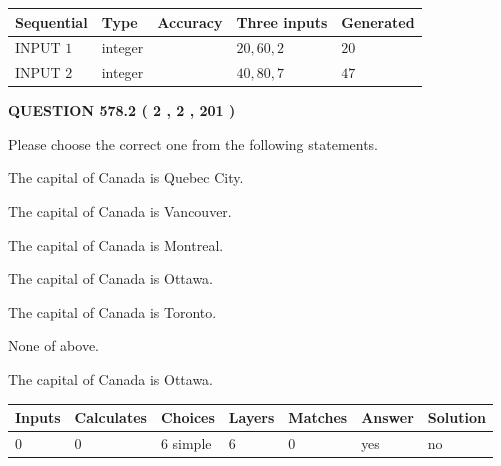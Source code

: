 \documentclass[12pt]{article}
\begin{document}
  
\noindent\begin{tabular}{|l|l|l|l|l|}
\hline
 Sequential & Type & Accuracy & Three inputs & Generated \\ 
\hline
 
 
  INPUT $  1 $ & integer &  & $
 20
 , 
 60
 , 
 2
 $ & $ 20 $ 
 \\  \hline  
 
 
  INPUT $  2 $ & integer &  & $
 40
 , 
 80
 , 
 7
 $ & $ 47 $ 
 \\  \hline  
 \end{tabular}
   
   
  
\vspace{0.2in}
  
{\textbf{\Large{QUESTION
578.2 
 ( 2 , 2 , 201 )
}}}
  
  
Please choose the correct one from the following statements.
 
 
The capital of Canada is Quebec City.
 
 
The capital of Canada is Vancouver.
 
 
The capital of Canada is Montreal.
 
 
The capital of Canada is Ottawa.
 
 
The capital of Canada is Toronto.
 
 
 None of above.
 
 
\noindent{}
 
 
The capital of Canada is Ottawa.
 
 
\noindent{}
 
 
   
   
   
   
\noindent\begin{tabular}{|l|l|l|l|l|l|l|}
 \hline
Inputs & Calculates & Choices & Layers & Matches & Answer & Solution \\ \hline
 0  & 
 0  & 
 6
  simple  
  & 
 6  & 
 0  & 
  yes & 
  no 
  \\ \hline
 \end{tabular}
   
   
   
\end{document}
